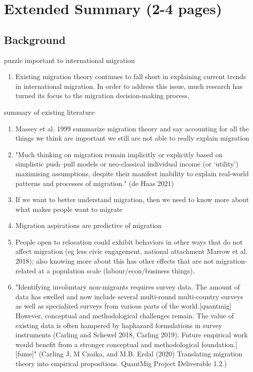 \setlength{\parindent}{4em}
\setlength{\parskip}{1em}
\renewcommand{\baselinestretch}{2.0}
\section*{Extended Summary (2-4 pages)}
\subsection*{Background}
puzzle important to international migration
\begin{enumerate}
    \item Existing migration theory continues to fall short in explaining current trends in international migration. In order to address this issue, much research has turned  its focus to the migration decision-making process.
\end{enumerate}
summary of existing literature
\begin{enumerate}
	\item Massey et al. 1999 summarize migration theory and say accounting for all the things we think are important we still are not able to really explain migration
	\item "Much thinking on migration remain implicitly or explicitly based on simplistic push–pull models or neo-classical individual income (or ‘utility’) maximising assumptions, despite their manifest inability to explain real-world patterns and processes of migration." (de Haas 2021)
	\item If we want to better understand migration, then we need to know more about what makes people want to migrate
	\item Migration aspirations are predictive of migration
	\item People open to relocation could exhibit behaviors in other ways that do not affect migration (eg less civic engagement, national attachment Marrow et al. 2018); also knowing more about this has other effects that are not migration-related at a population scale (labour/econ/business things).
	\item "Identifying involuntary non-migrants requires survey data. The amount of data has swelled and now include several multi-round multi-country surveys as well as specialized surveys from various parts of the world.[quantmig] However, conceptual and methodological challenges remain. The value of existing data is often hampered by haphazard formulations in survey instruments (Carling and Schewel 2018, Carling 2019). Future empirical work would benefit from a stronger conceptual and methodological foundation.][fume]" (Carling J, M Czaika, and M.B. Erdal (2020) Translating migration theory into empirical propositions. QuantMig Project Deliverable 1.2.)
\end{enumerate}
